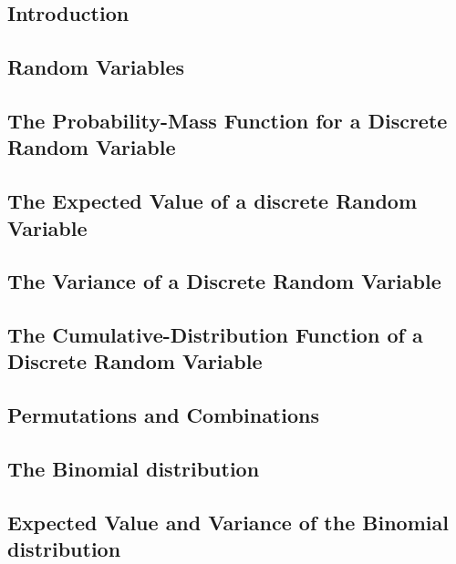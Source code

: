 \documentclass[12pt,]{article}
\theoremstyle{definition}
\theoremstyle{definition}
\theoremstyle{definition}
\theoremstyle{remark}
\begin{document}
\subsection{Introduction}\label{introduction-2}

\subsection{Random Variables}\label{random-variables}

\subsection{The Probability-Mass Function for a Discrete Random
Variable}\label{the-probability-mass-function-for-a-discrete-random-variable}

\subsection{The Expected Value of a discrete Random
Variable}\label{the-expected-value-of-a-discrete-random-variable}

\subsection{The Variance of a Discrete Random
Variable}\label{the-variance-of-a-discrete-random-variable}

\subsection{The Cumulative-Distribution Function of a Discrete Random
Variable}\label{the-cumulative-distribution-function-of-a-discrete-random-variable}

\subsection{Permutations and
Combinations}\label{permutations-and-combinations}

\subsection{The Binomial distribution}\label{the-binomial-distribution}

\subsection{Expected Value and Variance of the Binomial
distribution}\label{expected-value-and-variance-of-the-binomial-distribution}
\end{document}
